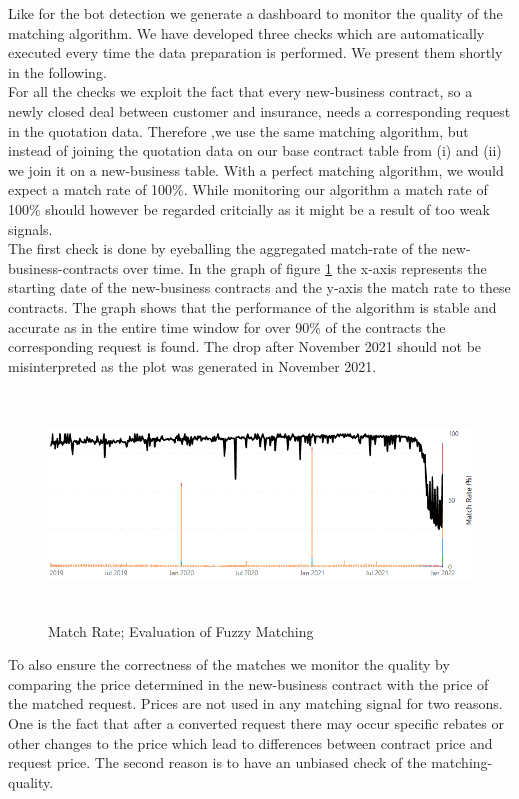 \documentclass[12pt,titlepage]{article}
\begin{document}
Like for the bot detection we generate a dashboard to monitor the quality of the matching algorithm. We have developed three checks which are automatically executed every time the data preparation is performed. We present them shortly in the following. \\
For all the checks we exploit the fact that every new-business contract, so a newly closed deal between customer and insurance, needs a corresponding request in the quotation data. Therefore ,we use the same matching algorithm, but instead of joining the quotation data on our base contract table from (i) and (ii) we join it on a new-business table. With a perfect matching algorithm, we would expect a match rate of 100\%. While monitoring our algorithm a match rate of 100\% should however be regarded critcially as it might be a result of too weak signals. \\
The first check is done by eyeballing the aggregated match-rate of the new-business-contracts over time. In the graph of figure \ref{fig:matchrate} the x-axis represents the starting date of the new-business contracts and the y-axis the match rate to these contracts. The graph shows that the performance of the algorithm is stable and accurate as in the entire time window for over 90\% of the contracts the corresponding request is found. The drop after November 2021 should not be misinterpreted as the plot was generated in November 2021. \\
\begin{figure}[H]
    \centerline{\includegraphics[height=6cm]{matching.png}}
\caption{Match Rate; Evaluation of Fuzzy Matching}
\label{fig:matchrate}
\end{figure}
\noindent
To also ensure the correctness of the matches we monitor the quality by comparing the price determined in the new-business contract with the price of the matched request. Prices are not used in any matching signal for two reasons. One is the fact that after a converted request there may occur specific rebates or other changes to the price which lead to differences between contract price and request price. The second reason is to have an unbiased check of the matching-quality. \\
\end{document}
